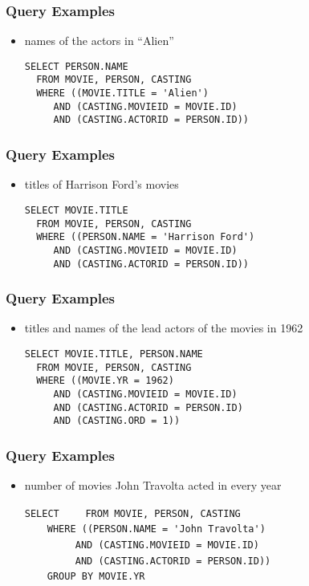 \documentclass[dvipsnames]{beamer}
\theoremstyle{plain}
\begin{document}
\begin{frame}[fragile]
  \frametitle{Query Examples}

  \begin{itemize}
    \item names of the actors in ``Alien''
     \begin{lstlisting}
SELECT PERSON.NAME
  FROM MOVIE, PERSON, CASTING
  WHERE ((MOVIE.TITLE = 'Alien')
     AND (CASTING.MOVIEID = MOVIE.ID)
     AND (CASTING.ACTORID = PERSON.ID))
      \end{lstlisting}
    \end{itemize}
\end{frame}

\begin{frame}[fragile]
  \frametitle{Query Examples}

  \begin{itemize}
    \item titles of Harrison Ford's movies
    \begin{lstlisting}
SELECT MOVIE.TITLE
  FROM MOVIE, PERSON, CASTING
  WHERE ((PERSON.NAME = 'Harrison Ford')
     AND (CASTING.MOVIEID = MOVIE.ID)
     AND (CASTING.ACTORID = PERSON.ID))
    \end{lstlisting}
  \end{itemize}
\end{frame}

\begin{frame}[fragile]
  \frametitle{Query Examples}

  \begin{itemize}
    \item titles and names of the lead actors of the movies in 1962
    \begin{lstlisting}
SELECT MOVIE.TITLE, PERSON.NAME
  FROM MOVIE, PERSON, CASTING
  WHERE ((MOVIE.YR = 1962)
     AND (CASTING.MOVIEID = MOVIE.ID)
     AND (CASTING.ACTORID = PERSON.ID)
     AND (CASTING.ORD = 1))
    \end{lstlisting}
  \end{itemize}
\end{frame}

\begin{frame}[fragile]
  \frametitle{Query Examples}

  \begin{itemize}
    \item number of movies John Travolta acted in every year

    \medskip
\lstinline!SELECT! 
~~~~\lstinline!FROM MOVIE, PERSON, CASTING!\\
\pause
~~~~\lstinline!WHERE ((PERSON.NAME = 'John Travolta')!\\
~~~~~~~~~\lstinline!AND (CASTING.MOVIEID = MOVIE.ID)!\\
~~~~~~~~~\lstinline!AND (CASTING.ACTORID = PERSON.ID))!\\
\pause
~~~~\lstinline!GROUP BY MOVIE.YR!
  \end{itemize}
\end{frame}
\end{document}
